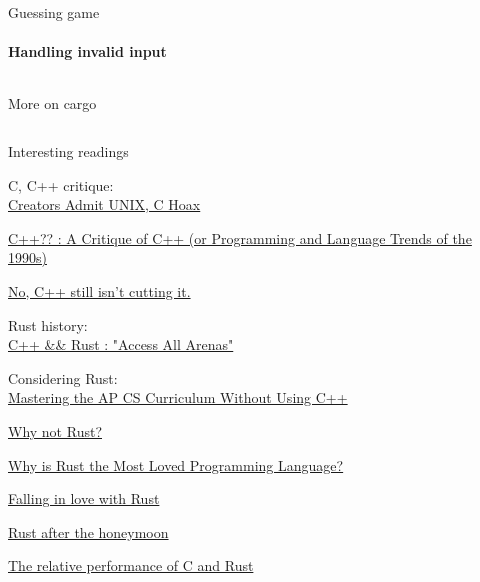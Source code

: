 \documentclass[usenames,dvipsnames,10pt,aspectratio=169]{beamer}
\begin{document}
\begin{frame}{Guessing game}
	\framesubtitle{Handling invalid input}
	\inputminted[fontsize=\normalsize]{rust}{code/guess7.rs}
\end{frame}

\begin{frame}{More on cargo}
	\inputminted[fontsize=\large]{shell}{code/cargo.sh}
	\vspace{0.5cm}
\end{frame}


\begin{frame}{Interesting readings} 

C, C++ critique:\\

\href{https://web.archive.org/web/19980425023657/http://paul.merton.ox.ac.uk/computing/unix.html}
{Creators Admit UNIX, C Hoax}

\href{https://web.archive.org/web/19990302094922/http://www.elj.com/cppcv3/}
{C++?? : A Critique of C++ (or Programming and Language Trends of the 1990s)}

\href{https://da-data.blogspot.com/2020/10/no-c-still-isnt-cutting-it.html}
{No, C++ still isn't cutting it.}

\vspace{0.5cm}
Rust history:\\ 

\href{https://youtu.be/HiWkMFE8uRE}{C++ \&\& Rust : "Access All Arenas"}

\vspace{0.5cm}
Considering Rust:\\

\href{https://web.archive.org/web/20030625015044/http://www.cs.rice.edu/CS/PLT/Teaching/Talks/TCEA-State-1998/C++/}
{Mastering the AP CS Curriculum Without Using C++}

\href{https://matklad.github.io/2020/09/20/why-not-rust.html}
{Why not Rust?}

\href{https://matklad.github.io/2020/02/14/why-rust-is-loved.html}
{Why is Rust the Most Loved Programming Language?}

\href{http://dtrace.org/blogs/bmc/2018/09/18/falling-in-love-with-rust/}
{Falling in love with Rust}

\href{http://dtrace.org/blogs/bmc/2020/10/11/rust-after-the-honeymoon/}
{Rust after the honeymoon}

\href{http://dtrace.org/blogs/bmc/2018/09/28/the-relative-performance-of-c-and-rust/}
{The relative performance of C and Rust}

\end{frame}

\end{document}

